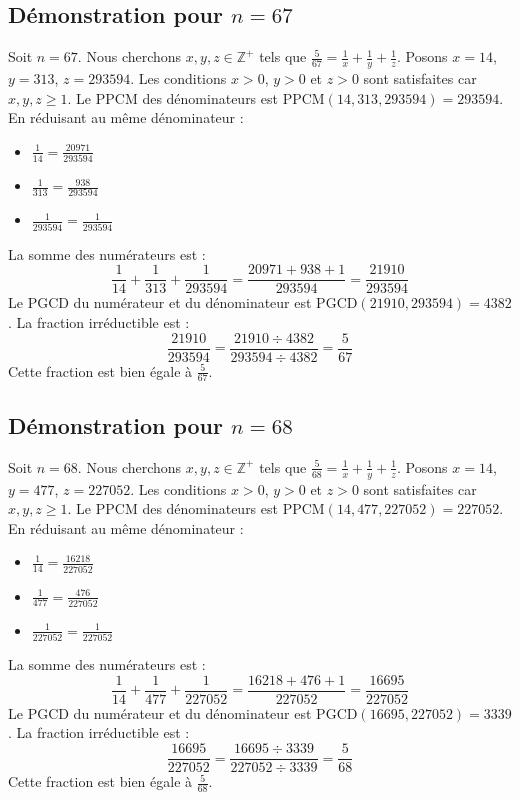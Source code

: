 \documentclass[11pt,a4paper]{article}
\begin{document}
\subsection{Démonstration pour $n = 67$}
Soit $n = 67$. Nous cherchons $x, y, z \in \mathbb{Z}^{+}$ tels que $\frac{5}{67} = \frac{1}{x} + \frac{1}{y} + \frac{1}{z}$.
Posons $x = 14$, $y = 313$, $z = 293594$.
Les conditions $x > 0$, $y > 0$ et $z > 0$ sont satisfaites car $x, y, z \geq 1$.
Le PPCM des dénominateurs est $\text{PPCM}(14, 313, 293594) = 293594$.
En réduisant au même dénominateur :
\begin{itemize}
    \item $\frac{1}{14} = \frac{20971}{293594}$
    \item $\frac{1}{313} = \frac{938}{293594}$
    \item $\frac{1}{293594} = \frac{1}{293594}$
\end{itemize}
La somme des numérateurs est :
$$ \frac{1}{14} + \frac{1}{313} + \frac{1}{293594} = \frac{20971 + 938 + 1}{293594} = \frac{21910}{293594} $$
Le PGCD du numérateur et du dénominateur est $\text{PGCD}(21910, 293594) = 4382$.
La fraction irréductible est :
$$ \frac{21910}{293594} = \frac{21910 \div 4382}{293594 \div 4382} = \frac{5}{67} $$
Cette fraction est bien égale à $\frac{5}{67}$.

\subsection{Démonstration pour $n = 68$}
Soit $n = 68$. Nous cherchons $x, y, z \in \mathbb{Z}^{+}$ tels que $\frac{5}{68} = \frac{1}{x} + \frac{1}{y} + \frac{1}{z}$.
Posons $x = 14$, $y = 477$, $z = 227052$.
Les conditions $x > 0$, $y > 0$ et $z > 0$ sont satisfaites car $x, y, z \geq 1$.
Le PPCM des dénominateurs est $\text{PPCM}(14, 477, 227052) = 227052$.
En réduisant au même dénominateur :
\begin{itemize}
    \item $\frac{1}{14} = \frac{16218}{227052}$
    \item $\frac{1}{477} = \frac{476}{227052}$
    \item $\frac{1}{227052} = \frac{1}{227052}$
\end{itemize}
La somme des numérateurs est :
$$ \frac{1}{14} + \frac{1}{477} + \frac{1}{227052} = \frac{16218 + 476 + 1}{227052} = \frac{16695}{227052} $$
Le PGCD du numérateur et du dénominateur est $\text{PGCD}(16695, 227052) = 3339$.
La fraction irréductible est :
$$ \frac{16695}{227052} = \frac{16695 \div 3339}{227052 \div 3339} = \frac{5}{68} $$
Cette fraction est bien égale à $\frac{5}{68}$.
\end{document}
